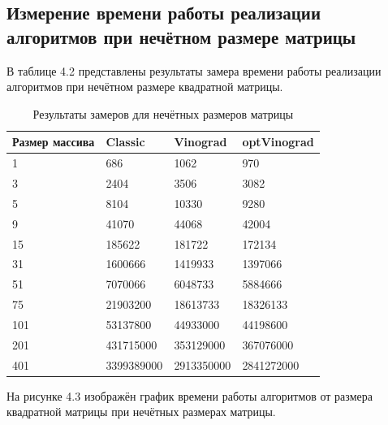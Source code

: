 \subsection{Измерение времени работы реализации алгоритмов при нечётном размере матрицы}
В таблице 4.2 представлены результаты замера времени работы реализации алгоритмов при нечётном размере
квадратной матрицы.

\FloatBarrier
\begin{table}[h!]

	\centering
	\begin{center}
	\begin{threeparttable}
	\caption{Результаты замеров для нечётных размеров матрицы}
	\begin{tabular}{ | l | l | l | l |}
		\hline
		Размер массива & Classic & Vinograd & optVinograd \\ \hline
		1 &        686 &       1062 &           970 \\
		3 &       2404 &       3506 &          3082 \\
		5 &       8104 &      10330 &          9280 \\
		9 &      41070 &      44068 &         42004 \\
	   15 &     185622 &     181722 &        172134 \\
	   31 &    1600666 &    1419933 &       1397066 \\
	   51 &    7070066 &    6048733 &       5884666 \\
	   75 &   21903200 &   18613733 &      18326133 \\
	  101 &   53137800 &   44933000 &      44198600 \\
	  201 &  431715000 &  353129000 &     367076000 \\
	  401 & 3399389000 & 2913350000 &    2841272000 \\
	\hline
	\end{tabular}
\end{threeparttable}
\end{center}
\end{table}
\FloatBarrier

На рисунке 4.3 изображён график времени работы алгоритмов от размера 
квадратной матрицы при нечётных размерах матрицы.

